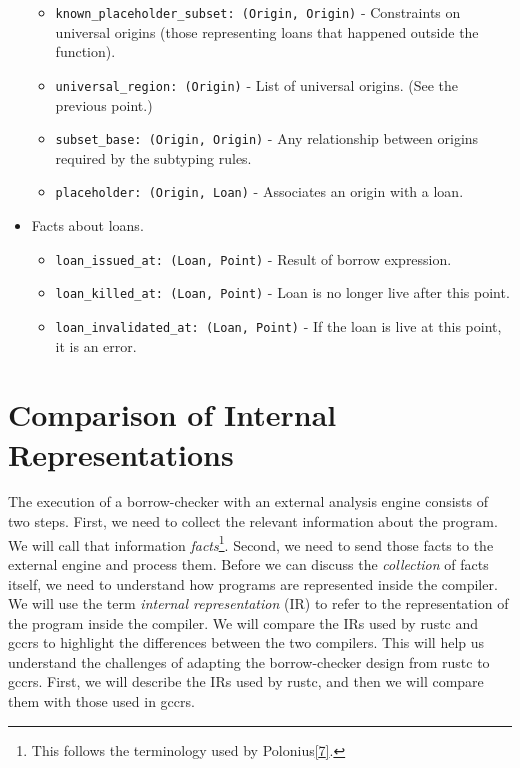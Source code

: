 \documentclass[
  11pt,
  twoside,symmetric]{report}
\providecommand{\tightlist}{%
  \setlength{\itemsep}{0pt}\setlength{\parskip}{0pt}}
\begin{document}
\begin{itemize}
  \begin{itemize}
  \tightlist
  \item
    \texttt{known\_placeholder\_subset:\ (Origin,\ Origin)} -
    Constraints on universal origins (those representing loans that
    happened outside the function).
  \item
    \texttt{universal\_region:\ (Origin)} - List of universal origins.
    (See the previous point.)
  \item
    \texttt{subset\_base:\ (Origin,\ Origin)} - Any relationship between
    origins required by the subtyping rules.
  \item
    \texttt{placeholder:\ (Origin,\ Loan)} - Associates an origin with a
    loan.
  \end{itemize}
\item
  Facts about loans.

  \begin{itemize}
  \tightlist
  \item
    \texttt{loan\_issued\_at:\ (Loan,\ Point)} - Result of borrow
    expression.
  \item
    \texttt{loan\_killed\_at:\ (Loan,\ Point)} - Loan is no longer live
    after this point.
  \item
    \texttt{loan\_invalidated\_at:\ (Loan,\ Point)} - If the loan is
    live at this point, it is an error.
  \end{itemize}
\end{itemize}

\hypertarget{comparison-of-internal-representations}{%
\chapter{Comparison of Internal
Representations}\label{comparison-of-internal-representations}}

The execution of a borrow-checker with an external analysis engine
consists of two steps. First, we need to collect the relevant
information about the program. We will call that information
\emph{facts}\footnote{This follows the terminology used by
  Polonius\protect\hyperlink{ref-polonius}{{[}7{]}}.}. Second, we need
to send those facts to the external engine and process them. Before we
can discuss the \emph{collection} of facts itself, we need to understand
how programs are represented inside the compiler. We will use the term
\emph{internal representation} (IR) to refer to the representation of
the program inside the compiler. We will compare the IRs used by rustc
and gccrs to highlight the differences between the two compilers. This
will help us understand the challenges of adapting the borrow-checker
design from rustc to gccrs. First, we will describe the IRs used by
rustc, and then we will compare them with those used in gccrs.
\end{document}
